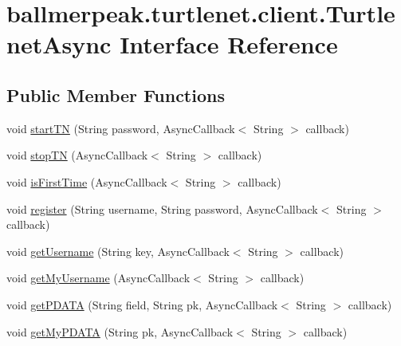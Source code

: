 \hypertarget{interfaceballmerpeak_1_1turtlenet_1_1client_1_1TurtlenetAsync}{\section{ballmerpeak.\-turtlenet.\-client.\-Turtlenet\-Async Interface Reference}
\label{interfaceballmerpeak_1_1turtlenet_1_1client_1_1TurtlenetAsync}
}
\subsection*{Public Member Functions}
\begin{DoxyCompactItemize}
\item 
void \hyperlink{interfaceballmerpeak_1_1turtlenet_1_1client_1_1TurtlenetAsync_a7e875c3b32ebacefaffa6ebd69aa2f44}{start\-T\-N} (String password, Async\-Callback$<$ String $>$ callback)
\item 
void \hyperlink{interfaceballmerpeak_1_1turtlenet_1_1client_1_1TurtlenetAsync_a70baaa36490a38c7e74cd9f57358336e}{stop\-T\-N} (Async\-Callback$<$ String $>$ callback)
\item 
void \hyperlink{interfaceballmerpeak_1_1turtlenet_1_1client_1_1TurtlenetAsync_ab4af3d58c26899d68d862bd720624a89}{is\-First\-Time} (Async\-Callback$<$ String $>$ callback)
\item 
void \hyperlink{interfaceballmerpeak_1_1turtlenet_1_1client_1_1TurtlenetAsync_a9190e36e28740c7d668894192b7f2426}{register} (String username, String password, Async\-Callback$<$ String $>$ callback)
\item 
void \hyperlink{interfaceballmerpeak_1_1turtlenet_1_1client_1_1TurtlenetAsync_a95d3fddff52812d79a984b9ef91c80ef}{get\-Username} (String key, Async\-Callback$<$ String $>$ callback)
\item 
void \hyperlink{interfaceballmerpeak_1_1turtlenet_1_1client_1_1TurtlenetAsync_a07b7f0d56105f4fc945a854a9a316e1e}{get\-My\-Username} (Async\-Callback$<$ String $>$ callback)
\item 
void \hyperlink{interfaceballmerpeak_1_1turtlenet_1_1client_1_1TurtlenetAsync_a2c1ffad266ffba1ced9024011b85ef80}{get\-P\-D\-A\-T\-A} (String field, String pk, Async\-Callback$<$ String $>$ callback)
\item 
void \hyperlink{interfaceballmerpeak_1_1turtlenet_1_1client_1_1TurtlenetAsync_acdbee21a3c9f37b2454fa81c6f81afe7}{get\-My\-P\-D\-A\-T\-A} (String pk, Async\-Callback$<$ String $>$ callback)

\end{DoxyCompactItemize}
